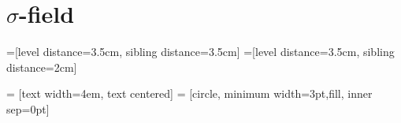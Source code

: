 \documentclass[12pt]{article}
\begin{document}
 

\rhead{\today}
 
\section{$\sigma$-field}
=[level distance=3.5cm, sibling distance=3.5cm]
=[level distance=3.5cm, sibling distance=2cm]

 = [text width=4em, text centered]
 = [circle, minimum width=3pt,fill, inner sep=0pt]
\end{document}
